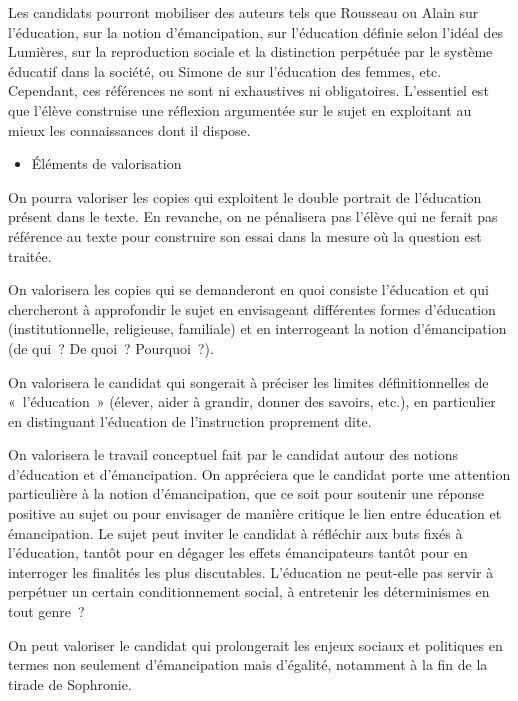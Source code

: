 {Les candidats pourront mobiliser des auteurs tels que Rousseau ou Alain sur
l'éducation,  sur la notion d'émancipation,  sur l'éducation définie selon
l'idéal des Lumières,  sur la reproduction sociale et la distinction perpétuée
par le système éducatif dans la société, ou Simone de  sur l'éducation des
femmes, etc. Cependant, ces références ne sont ni exhaustives ni obligatoires.
L'essentiel est que l'élève construise une réflexion argumentée sur le sujet en
exploitant au mieux les connaissances dont il dispose.

\begin{itemize}[label=\textbullet]
\item Éléments de valorisation
\end{itemize}

On pourra valoriser les copies qui exploitent le double portrait de l'éducation présent
dans le texte. En revanche, on ne pénalisera pas l'élève qui ne ferait pas référence au
texte pour construire son essai dans la mesure où la question est traitée.

On valorisera les copies qui se demanderont en quoi consiste l'éducation et qui
chercheront à approfondir le sujet en envisageant différentes formes d'éducation
(institutionnelle, religieuse, familiale) et en interrogeant la notion d'émancipation (de
qui~? De quoi~? Pourquoi~?).

On valorisera le candidat qui songerait à préciser les limites définitionnelles de
«~l'éducation~» (élever, aider à grandir, donner des savoirs, etc.), en particulier en
distinguant l'éducation de l'instruction proprement dite.

On valorisera le travail conceptuel fait par le candidat autour des notions d'éducation
et d'émancipation. On appréciera que le candidat porte une attention particulière à la
notion d'émancipation, que ce soit pour soutenir une réponse positive au sujet ou pour
envisager de manière critique le lien entre éducation et émancipation. Le sujet peut
inviter le candidat à réfléchir aux buts fixés à l'éducation, tantôt pour en dégager les
effets émancipateurs tantôt pour en interroger les finalités les plus discutables.
L'éducation ne peut-elle pas servir à perpétuer un certain conditionnement social, à
entretenir les déterminismes en tout genre~?

On peut valoriser le candidat qui prolongerait les enjeux sociaux et politiques en termes
non seulement d'émancipation mais d'égalité, notamment à la fin de la tirade de
Sophronie.}

